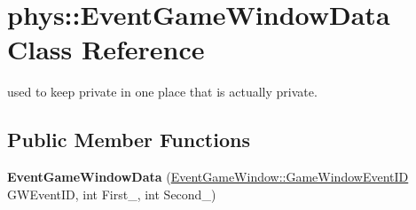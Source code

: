 \hypertarget{classphys_1_1EventGameWindowData}{
\section{phys::EventGameWindowData Class Reference}
\label{d1/d45/classphys_1_1EventGameWindowData}
}


used to keep private in one place that is actually private.  


\subsection*{Public Member Functions}
\begin{DoxyCompactItemize}
\item 
\hypertarget{classphys_1_1EventGameWindowData_a2b7b09702492bb6a83be2da2a70814c2}{
{\bfseries EventGameWindowData} (\hyperlink{classphys_1_1EventGameWindow_a45225255070513d3cff88cdfea25cc09}{EventGameWindow::GameWindowEventID} GWEventID, int First\_\-, int Second\_\-)}
\label{d1/d45/classphys_1_1EventGameWindowData_a2b7b09702492bb6a83be2da2a70814c2}

\end{DoxyCompactItemize}
